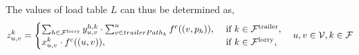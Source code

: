 The values of load table  $L$  can thus be determined as,
\begin{align}
	z^k_{u,v} = \begin{cases}
  \sum_{h \in \mathcal F^{\rm lorry} } y^{h,k}_{u,v} \cdot
  \sum_{v \in trailerPath_k}^u f^{\rm c}((v, p_h)),
  &   \text{ if }
   k \in \mathcal F^{\rm trailer},  \\
	x^k_{u,v} \cdot f^{\rm c}((u,v)) ,  & \text{ if } k \in \mathcal F^{\rm lorry},
	\end{cases}
	\quad u,v \in \mathcal V, k \in \mathcal F
\end{align}

